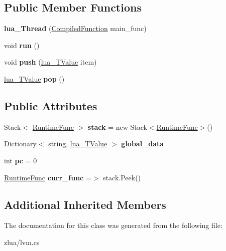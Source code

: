 \subsection*{Public Member Functions}
\begin{DoxyCompactItemize}
\item 
\mbox{\label{classzlua_1_1lua___thread_a636e6a5c2880d7d5c5b82284122dd46c}} 
{\bfseries lua\+\_\+\+Thread} (\mbox{\hyperlink{classzlua_1_1_compiled_function}{Compiled\+Function}} main\+\_\+func)
\item 
\mbox{\label{classzlua_1_1lua___thread_a97db462cd29e287ac92aaa4e4e189cf9}} 
void {\bfseries run} ()
\item 
\mbox{\label{classzlua_1_1lua___thread_aef81d9d2f99814679589de928a169dc1}} 
void {\bfseries push} (\mbox{\hyperlink{classzlua_1_1lua___t_value}{lua\+\_\+\+T\+Value}} item)
\item 
\mbox{\label{classzlua_1_1lua___thread_a6bea0e6f7b063a4c2c7b66e3ea152d31}} 
\mbox{\hyperlink{classzlua_1_1lua___t_value}{lua\+\_\+\+T\+Value}} {\bfseries pop} ()
\end{DoxyCompactItemize}
\subsection*{Public Attributes}
\begin{DoxyCompactItemize}
\item 
\mbox{\label{classzlua_1_1lua___thread_ac75eedf89c86746fddf420372c1ba7b8}} 
Stack$<$ \mbox{\hyperlink{classzlua_1_1_runtime_func}{Runtime\+Func}} $>$ {\bfseries stack} = new Stack$<$\mbox{\hyperlink{classzlua_1_1_runtime_func}{Runtime\+Func}}$>$()
\item 
\mbox{\label{classzlua_1_1lua___thread_a6dbf42b795dc65215c8f04958901bbee}} 
Dictionary$<$ string, \mbox{\hyperlink{classzlua_1_1lua___t_value}{lua\+\_\+\+T\+Value}} $>$ {\bfseries global\+\_\+data}
\item 
\mbox{\label{classzlua_1_1lua___thread_ab35e12bb7ab159fdef6ea7cb8548875d}} 
int {\bfseries pc} = 0
\item 
\mbox{\label{classzlua_1_1lua___thread_a826cce1f5eb8ad00973c8d4c4cda6754}} 
\mbox{\hyperlink{classzlua_1_1_runtime_func}{Runtime\+Func}} {\bfseries curr\+\_\+func} =$>$ stack.\+Peek()
\end{DoxyCompactItemize}
\subsection*{Additional Inherited Members}


The documentation for this class was generated from the following file\+:\begin{DoxyCompactItemize}
\item 
zlua/lvm.\+cs\end{DoxyCompactItemize}

